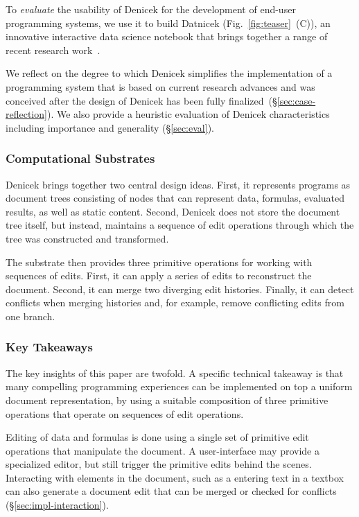 \documentclass[sigconf]{acmart}
\newcommand{\diff}[1]{{#1}}
\newcommand{\note}[1]{}
\begin{document}
To \emph{evaluate} the usability of Denicek for the development of end-user programming systems,
we use it to build Datnicek (Fig.~\ref{fig:teaser}~(C)), an innovative interactive data science notebook
that brings together a range of recent research work~\cite{kandel-2011-wrangler,drossos-2020-wrex,petricek-2022-thegamma,adams-2025-grove}.
\note{Clarify that Datnicek was designed after Denicek was completed.}
\diff{We reflect on the degree to which Denicek simplifies the implementation of a programming
system that is based on current research advances and was conceived after the design of Denicek
has been fully finalized~(\S\ref{sec:case-reflection}).} We also provide a heuristic evaluation
of Denicek characteristics including importance and generality (\S\ref{sec:eval}).

\subsubsection*{Computational Substrates}
Denicek brings together two central design ideas. First, it represents programs as
document trees consisting of nodes that can represent data, formulas, evaluated results, as well as
static content. Second, Denicek does not store the document tree itself, but instead, maintains
a sequence of edit operations through which the tree was constructed and transformed.

The substrate then provides three primitive operations for working with sequences of edits.
First, it can apply a series of edits to reconstruct the document. Second, it can merge two
diverging edit histories. Finally, it can detect conflicts when merging histories and, for
example, remove conflicting edits from one branch.

\subsubsection*{Key Takeaways}
\note{Add more general takeaway (below) and clarify specific technical takeaway (here).}
\diff{The key insights of this paper are twofold. A specific technical takeaway is that many
compelling programming experiences can be implemented on top a uniform document representation,
by using a suitable composition of three primitive operations that operate on sequences of
edit operations.}

Editing of data and formulas is done using a single set of primitive edit operations that
manipulate the document. A user-interface may provide a specialized editor, but still
trigger the primitive edits behind the scenes. Interacting with elements in the document,
such as a entering text in a textbox can also generate a document edit that can be merged or checked
for conflicts (\S\ref{sec:impl-interaction}).
\end{document}
